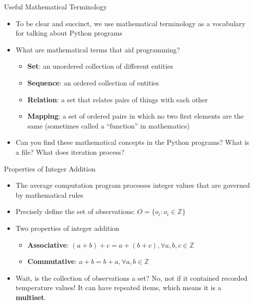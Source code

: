 \documentclass[14pt,aspectratio=169]{beamer}
\begin{document}
%
\begin{frame}{Useful Mathematical Terminology}
  \begin{itemize}
    \item To be clear and succinct, we use mathematical terminology as a
      vocabulary for talking about Python programs
      \vspace*{-.15in}
    \item What are mathematical terms that aid programming?
      \begin{itemize}
        \item {\bf Set}: an unordered collection of different entities
        \item {\bf Sequence}: an ordered collection of entities
        \item {\bf Relation}: a set that relates pairs of things with each other
        \item {\bf Mapping}: a set of ordered pairs in which no two first
          elements are the same (sometimes called a ``function'' in mathematics)
      \end{itemize}
      \vspace*{-.2in}
    \item Can you find these mathematical concepts in the Python programs?
      What is a file? What does iteration process?
  \end{itemize}
\end{frame}

%
\begin{frame}{Properties of Integer Addition}
  \vspace*{-.15in}
  \begin{itemize}
    \item The average computation program processes integer values that are
      governed by mathematical rules
      \vspace*{-.15in}
    \item Precisely define the set of observations: $O = \{ o_i : o_i \in
      \mathbb{Z}\}$
      \vspace*{-.15in}
    \item Two properties of integer addition
      \begin{itemize}
        \item {\bf Associative}: $(a + b) + c = a + (b + c), \forall a, b, c \in
          \mathbb{Z}$
        \item {\bf Commutative}: $a + b = b + a, \forall a, b \in \mathbb{Z}$
      \end{itemize}
      \vspace*{-.2in}
    \item Wait, is the collection of observations a set? No, not if it contained
      recorded temperature values! It can have repeated items, which means it is
      a {\bf multiset}.
  \end{itemize}
\end{frame}
\end{document}
